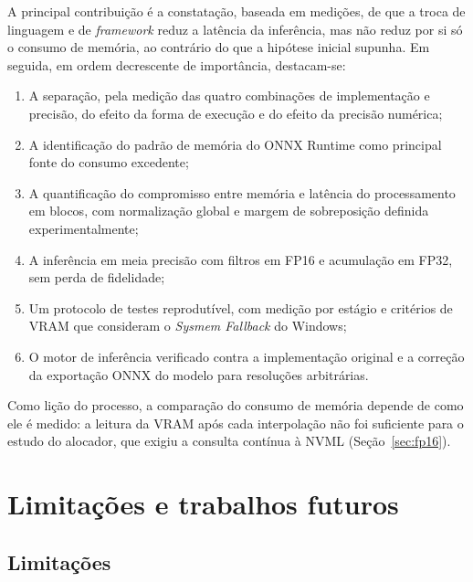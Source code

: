 \documentclass[
    12pt,                %
    openright,           %
    oneside,             %
    a4paper,             %
    english,             %
    brazil               %
]{abntex2}
\begin{document}
A principal contribuição é a constatação, baseada em medições, de que a troca de linguagem e de \textit{framework} reduz a latência da inferência, mas não reduz por si só o consumo de memória, ao contrário do que a hipótese inicial supunha. Em seguida, em ordem decrescente de importância, destacam-se:

\begin{enumerate}
    \item A separação, pela medição das quatro combinações de implementação e precisão, do efeito da forma de execução e do efeito da precisão numérica;
    \item A identificação do padrão de memória do ONNX Runtime como principal fonte do consumo excedente;
    \item A quantificação do compromisso entre memória e latência do processamento em blocos, com normalização global e margem de sobreposição definida experimentalmente;
    \item A inferência em meia precisão com filtros em FP16 e acumulação em FP32, sem perda de fidelidade;
    \item Um protocolo de testes reprodutível, com medição por estágio e critérios de VRAM que consideram o \textit{Sysmem Fallback} do Windows;
    \item O motor de inferência verificado contra a implementação original e a correção da exportação ONNX do modelo para resoluções arbitrárias.
\end{enumerate}

Como lição do processo, a comparação do consumo de memória depende de como ele é medido: a leitura da VRAM após cada interpolação não foi suficiente para o estudo do alocador, que exigiu a consulta contínua à NVML (Seção~\ref{sec:fp16}).

\section{Limitações e trabalhos futuros}

\subsection{Limitações}
\label{sec:limitacoes}
\end{document}
